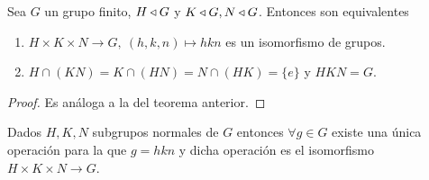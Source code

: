 \begin{cor}
	Sea $G$ un grupo finito, $H \mathbin{\triangleleft} G$ y $K \mathbin{\triangleleft} G, N \mathbin{\triangleleft} G$. Entonces son equivalentes
	\begin{enumerate}
		\item $H \times K \times N \to G,\ (h,k,n) \mapsto hkn$ es un isomorfismo de grupos.
		\item $H\cap (KN) = K \cap (HN) = N \cap (HK) = \{e\}$ y $HKN = G$.
	\end{enumerate}
\end{cor}

\begin{proof}
	Es análoga a la del teorema anterior.
\end{proof}

\begin{cor}
	Dados $H, K, N$ subgrupos normales de $G$ entonces $\forall g \in G$ existe una única operación para la que $g = hkn$ y dicha operación es el isomorfismo $H\times K \times N \to G$.
\end{cor}